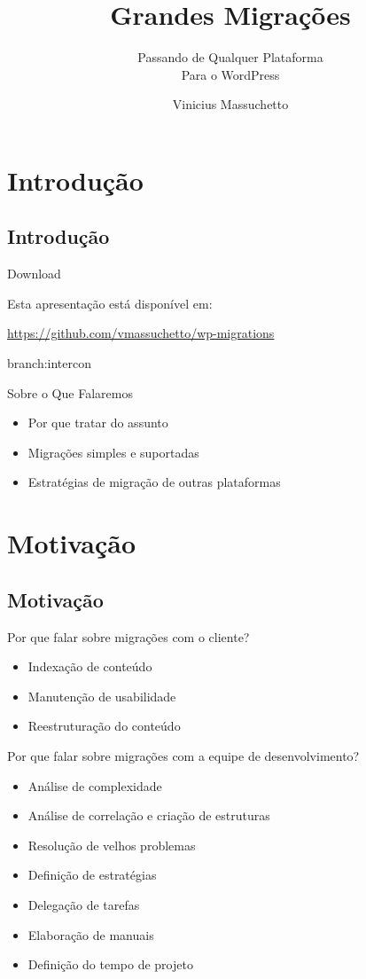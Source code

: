 \documentclass[handout]{beamer}
\title{Grandes Migrações}
\subtitle{Passando de Qualquer Plataforma \\
  Para o WordPress}
\author{Vinicius Massuchetto}
\begin{document}
\frame{\titlepage}

\section{Introdução}
\subsection{Introdução}

\begin{frame}{Download}
  \begin{center}
    Esta apresentação está disponível em:

    \url{https://github.com/vmassuchetto/wp-migrations}

    branch:intercon
  \end{center}
\end{frame}

\begin{frame}{Sobre o Que Falaremos}
\begin{itemize}
  \item Por que tratar do assunto
  \item Migrações simples e suportadas
  \item Estratégias de migração de outras plataformas
\end{itemize}
\end{frame}

\section{Motivação}
\subsection{Motivação}

\begin{frame}{Por que falar sobre migrações com o cliente?}
\begin{itemize}
  \pause \item Indexação de conteúdo
  \pause \item Manutenção de usabilidade
  \pause \item Reestruturação do conteúdo
\end{itemize}
\end{frame}

\begin{frame}{Por que falar sobre migrações com a equipe de desenvolvimento?}
\begin{itemize}
  \pause \item Análise de complexidade
  \pause \item Análise de correlação e criação de estruturas
  \pause \item Resolução de velhos problemas
  \pause \item Definição de estratégias
  \pause \item Delegação de tarefas
  \pause \item Elaboração de manuais
  \pause \item Definição do tempo de projeto
\end{itemize}
\end{frame}
\end{document}
